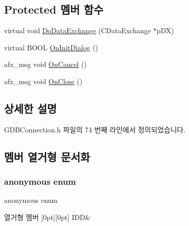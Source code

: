 \subsection*{Protected 멤버 함수}
\begin{DoxyCompactItemize}
\item 
virtual void \mbox{\hyperlink{class_g_d_b_waiting_dlg_af600ff1c657c7db6c325a5276328a4a0}{Do\+Data\+Exchange}} (C\+Data\+Exchange $\ast$p\+DX)
\item 
virtual B\+O\+OL \mbox{\hyperlink{class_g_d_b_waiting_dlg_a9709c0dd18068bfc9f3e9b0c06f1b6d6}{On\+Init\+Dialog}} ()
\item 
afx\+\_\+msg void \mbox{\hyperlink{class_g_d_b_waiting_dlg_a5838b8b0663a918e2ceaaa2018ed29ae}{On\+Cancel}} ()
\item 
afx\+\_\+msg void \mbox{\hyperlink{class_g_d_b_waiting_dlg_a9f08e30520f95b333ba224ebd41c47e3}{On\+Close}} ()
\end{DoxyCompactItemize}


\subsection{상세한 설명}


G\+D\+B\+Connection.\+h 파일의 74 번째 라인에서 정의되었습니다.



\subsection{멤버 열거형 문서화}
\mbox{\label{class_g_d_b_waiting_dlg_aa533de8ec8419795c0d1572d637c9101}} 
\subsubsection{\texorpdfstring{anonymous enum}{anonymous enum}}
{\footnotesize\ttfamily anonymous enum}

\begin{DoxyEnumFields}{열거형 멤버}
[0pt][0pt]{}\mbox{\label{class_g_d_b_waiting_dlg_aa533de8ec8419795c0d1572d637c9101a46edec94a924f41c80746b5923deab43}} 
I\+DD&\\
\hline

\end{DoxyEnumFields}



